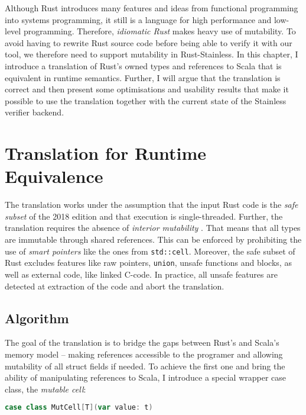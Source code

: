 Although Rust introduces many features and ideas from functional programming
into systems programming, it still is a language for high performance and
low-level programming. Therefore, \emph{idiomatic Rust} makes heavy use of
mutability. To avoid having to rewrite Rust source code before being able to
verify it with our tool, we therefore need to support mutability in
Rust-Stainless. In this chapter, I introduce a translation of Rust's owned types
and references to Scala that is equivalent in runtime semantics. Further, I will
argue that the translation is correct and then present some optimisations and
usability results that make it possible to use the translation together with the
current state of the Stainless verifier backend.

\section{Translation for Runtime Equivalence}
\label{sec:translation}

The translation works under the assumption that the input Rust code is the
\emph{safe subset} \cite[section ``Unsafety'']{rustref} of the 2018 edition and
that execution is single-threaded. Further, the translation requires the absence
of \emph{interior mutability} \cite[section ``Interior Mutability'']{rustref}.
That means that all types are immutable through shared references. This can be
enforced by prohibiting the use of \emph{smart pointers} like the ones from
\passthrough{\lstinline!std::cell!}. Moreover, the safe subset of Rust excludes
features like raw pointers, \passthrough{\lstinline!union!}, unsafe functions
and blocks, as well as external code, like linked C-code. In practice, all
unsafe features are detected at extraction of the code and abort the
translation.


\subsection{Algorithm}

The goal of the translation is to bridge the gaps between Rust's and Scala's
memory model -- making references accessible to the programer and allowing
mutability of all struct fields if needed. To achieve the first one and bring
the ability of manipulating references to Scala, I introduce a special wrapper
case class, the \emph{mutable cell}:

\begin{lstlisting}[language=Scala, style=short]
case class MutCell[T](var value: t)
\end{lstlisting}

